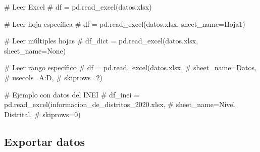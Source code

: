 \documentclass[
  doc,
  floatsintext,
  longtable,
  a4paper,
  nolmodern,
  notxfonts,
  notimes,
  12pt,
  colorlinks=true,linkcolor=blue,citecolor=blue,urlcolor=blue]{apa7}
\newenvironment{Shaded}{\begin{snugshade}}{\end{snugshade}}
\newcommand{\CommentTok}[1]{\textcolor[rgb]{0.37,0.37,0.37}{#1}}
\begin{document}
\begin{Shaded}
\begin{Highlighting}[]
\CommentTok{\# Leer Excel}
\CommentTok{\# df = pd.read\_excel(\textquotesingle{}datos.xlsx\textquotesingle{})}

\CommentTok{\# Leer hoja específica}
\CommentTok{\# df = pd.read\_excel(\textquotesingle{}datos.xlsx\textquotesingle{}, sheet\_name=\textquotesingle{}Hoja1\textquotesingle{})}

\CommentTok{\# Leer múltiples hojas}
\CommentTok{\# df\_dict = pd.read\_excel(\textquotesingle{}datos.xlsx\textquotesingle{}, sheet\_name=None)}

\CommentTok{\# Leer rango específico}
\CommentTok{\# df = pd.read\_excel(\textquotesingle{}datos.xlsx\textquotesingle{}, }
\CommentTok{\#                    sheet\_name=\textquotesingle{}Datos\textquotesingle{},}
\CommentTok{\#                    usecols=\textquotesingle{}A:D\textquotesingle{},}
\CommentTok{\#                    skiprows=2)}

\CommentTok{\# Ejemplo con datos del INEI}
\CommentTok{\# df\_inei = pd.read\_excel(\textquotesingle{}informacion\_de\_distritos\_2020.xlsx\textquotesingle{},}
\CommentTok{\#                         sheet\_name=\textquotesingle{}Nivel Distrital\textquotesingle{},}
\CommentTok{\#                         skiprows=0)}
\end{Highlighting}
\end{Shaded}

\subsection{Exportar datos}\label{exportar-datos}
\end{document}
